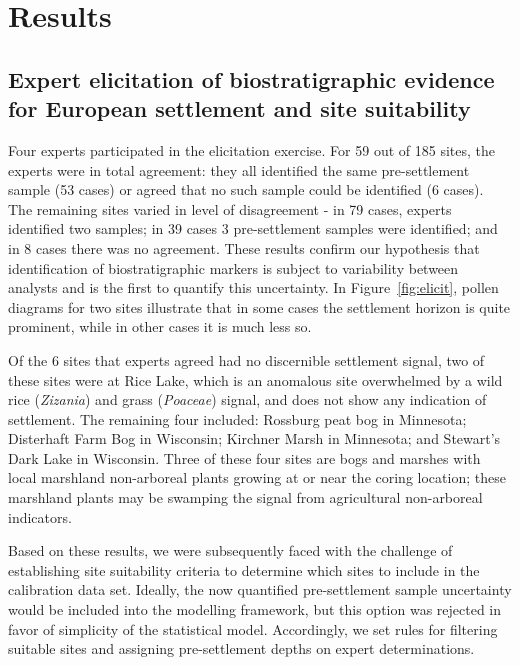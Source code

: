 \documentclass[12pt]{article}
\begin{document}
\section{Results}

\subsection{Expert elicitation of biostratigraphic evidence for European settlement and site suitability}

Four experts participated in the elicitation exercise. For 59 out of
185 sites, the experts were in total agreement: they all identified
the same pre-settlement sample (53 cases) or agreed that no such
sample could be identified (6 cases). The remaining sites varied in
level of disagreement - in 79 cases, experts identified two samples;
in 39 cases 3 pre-settlement samples were identified; and in 8 cases
there was no agreement. These results confirm our hypothesis that
identification of biostratigraphic markers is subject to variability
between analysts and is the first to quantify this uncertainty. In
Figure~\ref{fig:elicit}, pollen diagrams for two sites illustrate that
in some cases the settlement horizon is quite prominent, while in
other cases it is much less so.

Of the 6 sites that experts agreed had no discernible settlement
signal, two of these sites were at Rice Lake, which is an anomalous
site overwhelmed by a wild rice (\textit{Zizania}) and grass
(\textit{Poaceae}) signal, and does not show any indication of
settlement. The remaining four included: Rossburg peat bog in
Minnesota; Disterhaft Farm Bog in Wisconsin; Kirchner Marsh in
Minnesota; and Stewart’s Dark Lake in Wisconsin. Three of these four
sites are bogs and marshes with local marshland non-arboreal plants
growing at or near the coring location; these marshland plants may be
swamping the signal from agricultural non-arboreal indicators.

Based on these results, we were subsequently faced with the challenge
of establishing site suitability criteria to determine which sites to
include in the calibration data set. Ideally, the now quantified
pre-settlement sample uncertainty would be included into the modelling
framework, but this option was rejected in favor of simplicity of the
statistical model. Accordingly, we set rules for filtering suitable
sites and assigning pre-settlement depths on expert determinations.

\end{document}
